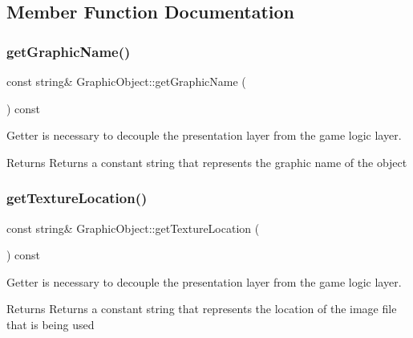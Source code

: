\subsection{Member Function Documentation}
\mbox{\label{class_graphic_object_a8772813296b837e997ee21836e92b028}} 
\subsubsection{\texorpdfstring{get\+Graphic\+Name()}{getGraphicName()}}
{\footnotesize\ttfamily const string\& Graphic\+Object\+::get\+Graphic\+Name (\begin{DoxyParamCaption}{ }\end{DoxyParamCaption}) const\hspace{0.3cm}{\ttfamily [inline]}}



Getter is necessary to decouple the presentation layer from the game logic layer. 

\begin{DoxyReturn}{Returns}
Returns a constant string that represents the graphic name of the object 
\end{DoxyReturn}
\mbox{\label{class_graphic_object_a1041a2dd82f82fc724675c5a2ea67d32}} 
\subsubsection{\texorpdfstring{get\+Texture\+Location()}{getTextureLocation()}}
{\footnotesize\ttfamily const string\& Graphic\+Object\+::get\+Texture\+Location (\begin{DoxyParamCaption}{ }\end{DoxyParamCaption}) const\hspace{0.3cm}{\ttfamily [inline]}}



Getter is necessary to decouple the presentation layer from the game logic layer. 

\begin{DoxyReturn}{Returns}
Returns a constant string that represents the location of the image file that is being used 
\end{DoxyReturn}


